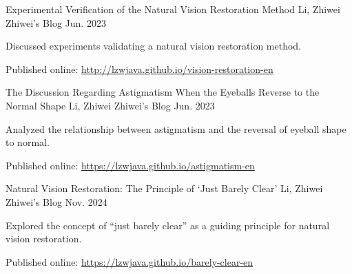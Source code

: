 

\begin{cventries}

  \cventry
    {Experimental Verification of the Natural Vision Restoration Method} %
    {Li, Zhiwei} %
    {Zhiwei’s Blog} %
    {Jun. 2023} %
    {
      \begin{cvitems}
        \item {Discussed experiments validating a natural vision restoration method.}
        \item {Published online: \href{http://lzwjava.github.io/vision-restoration-en}{http://lzwjava.github.io/vision-restoration-en}}
      \end{cvitems}
    }

  \cventry
    {The Discussion Regarding Astigmatism When the Eyeballs Reverse to the Normal Shape} %
    {Li, Zhiwei} %
    {Zhiwei’s Blog} %
    {Jun. 2023} %
    {
      \begin{cvitems}
        \item {Analyzed the relationship between astigmatism and the reversal of eyeball shape to normal.}
        \item {Published online: \href{https://lzwjava.github.io/astigmatism-en}{https://lzwjava.github.io/astigmatism-en}}
      \end{cvitems}
    }

  \cventry
    {Natural Vision Restoration: The Principle of ‘Just Barely Clear’} %
    {Li, Zhiwei} %
    {Zhiwei’s Blog} %
    {Nov. 2024} %
    {
      \begin{cvitems}
        \item {Explored the concept of “just barely clear” as a guiding principle for natural vision restoration.}
        \item {Published online: \href{https://lzwjava.github.io/barely-clear-en}{https://lzwjava.github.io/barely-clear-en}}
      \end{cvitems}
    }

\end{cventries}
